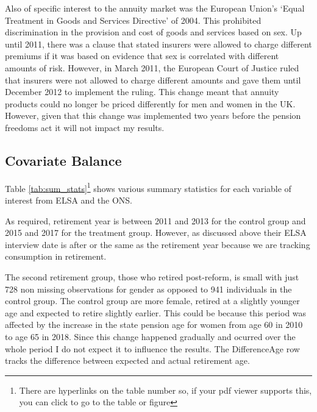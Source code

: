 \documentclass[12pt]{article}
\begin{document}
Also of specific interest to the annuity market was the European Union's `Equal
Treatment in Goods and Services Directive' of 2004. This prohibited
discrimination in the provision and cost of goods and services based on sex. Up
until 2011, there was a clause that stated insurers were allowed to charge
different premiums if it was based on evidence that sex is correlated with
different amounts of risk. However, in March 2011, the European Court of Justice
ruled that insurers were not allowed to charge different amounts and gave them
until December 2012 to implement the ruling. This change meant that annuity
products could no longer be priced differently for men and women in the UK.
However, given that this change was implemented two years before the pension
freedoms act it will not impact my results.



\subsection{Covariate Balance}

Table \ref{tab:sum_stats}\footnote{There are hyperlinks on the table number so,
    if your pdf viewer supports this, you can click to go to the table or
    figure} shows various summary statistics for each variable of interest from
ELSA and the ONS.

As required, retirement year is between 2011 and 2013 for the control group and
2015 and 2017 for the treatment group. However, as discussed above their ELSA
interview date is after or the same as the retirement year because we are
tracking consumption in retirement.

The second retirement group, those who retired post-reform, is small with just
728 non missing observations for gender as opposed to 941 individuals in the
control group. The control group are more female, retired at a slightly younger
age and expected to retire slightly earlier. This could be because this period
was affected by the increase in the state pension age for women from age 60 in
2010 to age 65 in 2018. Since this change happened gradually and ocurred over
the whole period I do not expect it to influence the results. The DifferenceAge
row tracks the difference between expected and actual retirement age.
\end{document}
